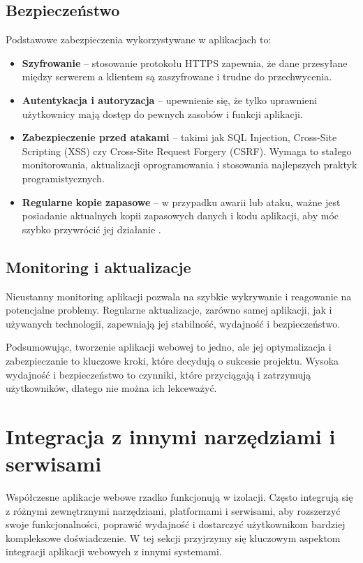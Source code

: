 \subsection{Bezpieczeństwo}
Podstawowe zabezpieczenia wykorzystywane w aplikacjach to:

\begin{itemize}
\item \textbf{Szyfrowanie} -- stosowanie protokołu HTTPS zapewnia, że dane przesyłane między serwerem a klientem są zaszyfrowane i trudne do przechwycenia.
\item \textbf{Autentykacja i autoryzacja} -- upewnienie się, że tylko uprawnieni użytkownicy mają dostęp do pewnych zasobów i funkcji aplikacji.
\item \textbf{Zabezpieczenie przed atakami} -- takimi jak SQL Injection, Cross-Site Scripting (XSS) czy Cross-Site Request Forgery (CSRF). Wymaga to stałego monitorowania, aktualizacji oprogramowania i stosowania najlepszych praktyk programistycznych.
\item \textbf{Regularne kopie zapasowe} -- w przypadku awarii lub ataku, ważne jest posiadanie aktualnych kopii zapasowych danych i kodu aplikacji, aby móc szybko przywrócić jej działanie \cite{sekurakBezpieczenstwo}.
\end{itemize}

\subsection{Monitoring i aktualizacje}

Nieustanny monitoring aplikacji pozwala na szybkie wykrywanie i reagowanie na potencjalne problemy. Regularne aktualizacje, zarówno samej aplikacji, jak i używanych technologii, zapewniają jej stabilność, wydajność i bezpieczeństwo.

Podsumowując, tworzenie aplikacji webowej to jedno, ale jej optymalizacja i zabezpieczanie to kluczowe kroki, które decydują o sukcesie projektu. Wysoka wydajność i bezpieczeństwo to czynniki, które przyciągają i zatrzymują użytkowników, dlatego nie można ich lekceważyć.

\section{Integracja z innymi narzędziami i serwisami}

Współczesne aplikacje webowe rzadko funkcjonują w izolacji. Często integrują się z różnymi zewnętrznymi narzędziami, platformami i serwisami, aby rozszerzyć swoje funkcjonalności, poprawić wydajność i dostarczyć użytkownikom bardziej kompleksowe doświadczenie. W tej sekcji przyjrzymy się kluczowym aspektom integracji aplikacji webowych z innymi systemami.

